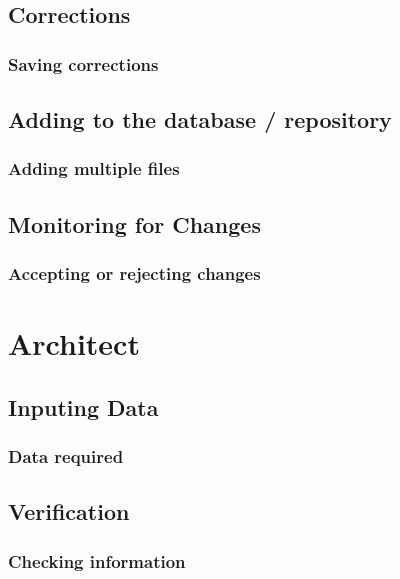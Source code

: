 \documentclass[a4paper,12pt]{article}
\begin{document}
   \subsection{Corrections}
      
      \subsubsection{Saving corrections}

    \subsection{Adding to the database / repository}
      
      \subsubsection{Adding multiple files}

    \subsection{Monitoring for Changes}

      \subsubsection{Accepting or rejecting changes}
      
\pagebreak

\section{\bf Architect}

  \subsection{Inputing Data}

     \subsubsection{Data required}
  
   \subsection{Verification}

      \subsubsection{Checking information}
      
\end{document}
